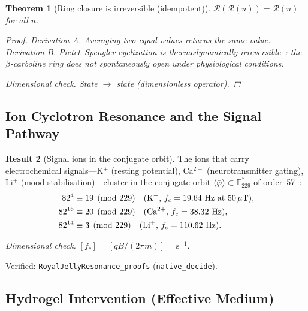 \documentclass[12pt,oneside]{article}
\theoremstyle{principia}
\newtheorem{theorem}{Theorem}[section]
\theoremstyle{definition}
\newtheorem{result}[theorem]{Result}
\theoremstyle{remark}
\begin{document}
\begin{theorem}[Ring closure is irreversible (idempotent)]
$\mathcal{R}(\mathcal{R}(u)) = \mathcal{R}(u)$ for all $u$.

\begin{proof}
\emph{Derivation A.} Averaging two equal values returns the same value.
\emph{Derivation B.} Pictet--Spengler cyclization is thermodynamically
irreversible~\cite{stockigt11}: the $\beta$-carboline ring does not
spontaneously open under physiological conditions.

\emph{Dimensional check.} State $\to$ state (dimensionless operator). \checkmark
\qedhere
\end{proof}
\end{theorem}

\subsection{Ion Cyclotron Resonance and the Signal Pathway}

\begin{result}[Signal ions in the conjugate orbit]
\label{res:ions}
The ions that carry electrochemical signals---K$^+$ (resting potential),
Ca$^{2+}$ (neurotransmitter gating), Li$^+$ (mood stabilisation)---cluster
in the conjugate orbit $\langle\bar\varphi\rangle \subset \mathbb{F}_{229}^*$
of order~57~\cite{rja}:
\begin{align}
  82^4 &\equiv 19 \pmod{229} \quad\text{(K$^+$, $f_c = 19.64$ Hz at 50\,$\mu$T)}, \\
  82^{16} &\equiv 20 \pmod{229} \quad\text{(Ca$^{2+}$, $f_c = 38.32$ Hz)}, \\
  82^{14} &\equiv 3 \pmod{229} \quad\text{(Li$^+$, $f_c = 110.62$ Hz)}.
\end{align}

\emph{Dimensional check.} $[f_c] = [qB/(2\pi m)] = \mathrm{s^{-1}}$. \checkmark

Verified: \texttt{RoyalJellyResonance\_proofs} (\texttt{native\_decide}).
\end{result}

\subsection{Hydrogel Intervention (Effective Medium)}
\end{document}
